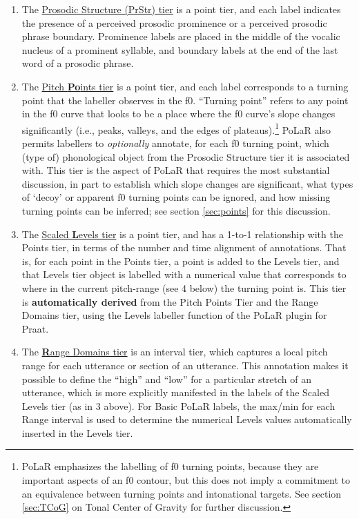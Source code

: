 \documentclass[11pt, twoside]{memoir}
\begin{document}
\begin{enumerate} \def\labelenumi{\arabic{enumi}.}
\item The \uline{Prosodic Structure (PrStr) tier} is a point tier, and each label indicates the presence of a perceived prosodic prominence or a perceived prosodic phrase boundary. Prominence labels are placed in the middle of the vocalic nucleus of a prominent syllable, and boundary labels at the end of the last word of a prosodic phrase.
\item The \uline{Pitch \textbf{Po}ints tier} is a point tier, and each label corresponds to a turning point that the labeller observes in the f0. “Turning point” refers to any point in the f0 curve that looks to be a place where the f0 curve’s slope changes significantly (i.e., peaks, valleys, and the edges of plateaus).\footnote{PoLaR emphasizes the labelling of f0 turning points, because they are important aspects of an f0 contour, but this does not imply a commitment to an equivalence between turning points and intonational targets. See section \ref{sec:TCoG} on Tonal Center of Gravity for further discussion.} PoLaR also permits labellers to \textit{optionally} annotate, for each f0 turning point, which (type of) phonological object from the Prosodic Structure tier it is associated with. This tier is the aspect of PoLaR that requires the most substantial discussion, in part to establish which slope changes are significant, what types of ‘decoy’ or apparent f0 turning points can be ignored, and how missing turning points can be inferred; see section \ref{sec:points} for this discussion.
\item The \uline{Scaled \textbf{L}evels tier} is a point tier, and has a 1-to-1 relationship with the Points tier, in terms of the number and time alignment of annotations. That is, for each point in the Points tier, a point is added to the Levels tier, and that Levels tier object is labelled with a numerical value that corresponds to where in the current pitch-range (see 4 below) the turning point is. This tier is \textbf{automatically derived} from the Pitch Points Tier and the Range Domains tier, using the Levels labeller function of the PoLaR plugin for Praat.
\item The \uline{\textbf{R}ange Domains tier} is an interval tier, which captures a local pitch range for each utterance or section of an utterance. This annotation makes it possible to define the “high” and “low” for a particular stretch of an utterance, which is more explicitly manifested in the labels of the Scaled Levels tier (as in 3 above). For Basic PoLaR labels, the max\slash min for each Range interval is used to determine the numerical Levels values automatically inserted in the Levels tier. \end{enumerate}
\end{document}
